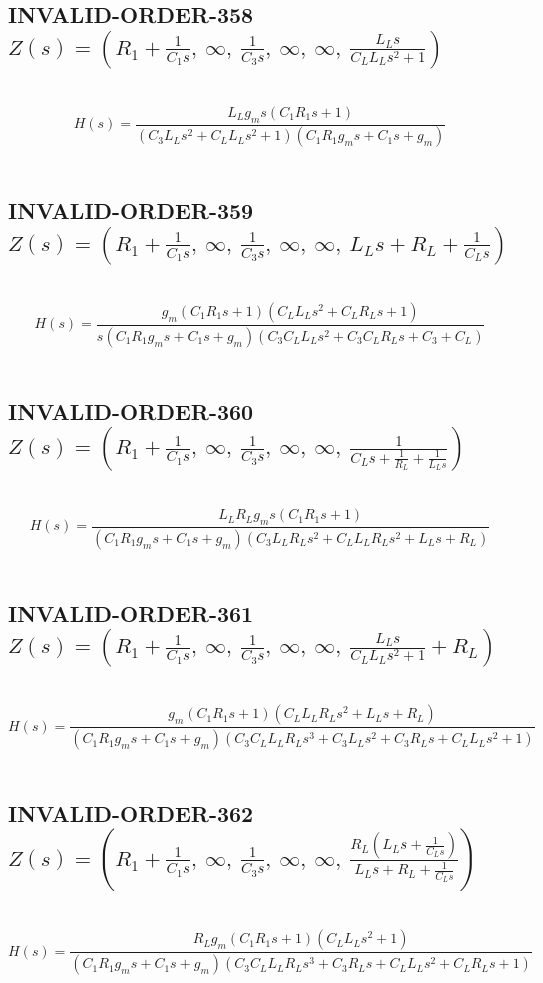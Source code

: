 \documentclass{article}
\begin{document}
\subsection{INVALID-ORDER-358 $Z(s) = \left( R_{1} + \frac{1}{C_{1} s}, \  \infty, \  \frac{1}{C_{3} s}, \  \infty, \  \infty, \  \frac{L_{L} s}{C_{L} L_{L} s^{2} + 1}\right)$ } \ 
\textbf{\[H(s) = \frac{L_{L} g_{m} s \left(C_{1} R_{1} s + 1\right)}{\left(C_{3} L_{L} s^{2} + C_{L} L_{L} s^{2} + 1\right) \left(C_{1} R_{1} g_{m} s + C_{1} s + g_{m}\right)}\] } \ 
\subsection{INVALID-ORDER-359 $Z(s) = \left( R_{1} + \frac{1}{C_{1} s}, \  \infty, \  \frac{1}{C_{3} s}, \  \infty, \  \infty, \  L_{L} s + R_{L} + \frac{1}{C_{L} s}\right)$ } \ 
\textbf{\[H(s) = \frac{g_{m} \left(C_{1} R_{1} s + 1\right) \left(C_{L} L_{L} s^{2} + C_{L} R_{L} s + 1\right)}{s \left(C_{1} R_{1} g_{m} s + C_{1} s + g_{m}\right) \left(C_{3} C_{L} L_{L} s^{2} + C_{3} C_{L} R_{L} s + C_{3} + C_{L}\right)}\] } \ 
\subsection{INVALID-ORDER-360 $Z(s) = \left( R_{1} + \frac{1}{C_{1} s}, \  \infty, \  \frac{1}{C_{3} s}, \  \infty, \  \infty, \  \frac{1}{C_{L} s + \frac{1}{R_{L}} + \frac{1}{L_{L} s}}\right)$ } \ 
\textbf{\[H(s) = \frac{L_{L} R_{L} g_{m} s \left(C_{1} R_{1} s + 1\right)}{\left(C_{1} R_{1} g_{m} s + C_{1} s + g_{m}\right) \left(C_{3} L_{L} R_{L} s^{2} + C_{L} L_{L} R_{L} s^{2} + L_{L} s + R_{L}\right)}\] } \ 
\subsection{INVALID-ORDER-361 $Z(s) = \left( R_{1} + \frac{1}{C_{1} s}, \  \infty, \  \frac{1}{C_{3} s}, \  \infty, \  \infty, \  \frac{L_{L} s}{C_{L} L_{L} s^{2} + 1} + R_{L}\right)$ } \ 
\textbf{\[H(s) = \frac{g_{m} \left(C_{1} R_{1} s + 1\right) \left(C_{L} L_{L} R_{L} s^{2} + L_{L} s + R_{L}\right)}{\left(C_{1} R_{1} g_{m} s + C_{1} s + g_{m}\right) \left(C_{3} C_{L} L_{L} R_{L} s^{3} + C_{3} L_{L} s^{2} + C_{3} R_{L} s + C_{L} L_{L} s^{2} + 1\right)}\] } \ 
\subsection{INVALID-ORDER-362 $Z(s) = \left( R_{1} + \frac{1}{C_{1} s}, \  \infty, \  \frac{1}{C_{3} s}, \  \infty, \  \infty, \  \frac{R_{L} \left(L_{L} s + \frac{1}{C_{L} s}\right)}{L_{L} s + R_{L} + \frac{1}{C_{L} s}}\right)$ } \ 
\textbf{\[H(s) = \frac{R_{L} g_{m} \left(C_{1} R_{1} s + 1\right) \left(C_{L} L_{L} s^{2} + 1\right)}{\left(C_{1} R_{1} g_{m} s + C_{1} s + g_{m}\right) \left(C_{3} C_{L} L_{L} R_{L} s^{3} + C_{3} R_{L} s + C_{L} L_{L} s^{2} + C_{L} R_{L} s + 1\right)}\] } \ 
\end{document}
